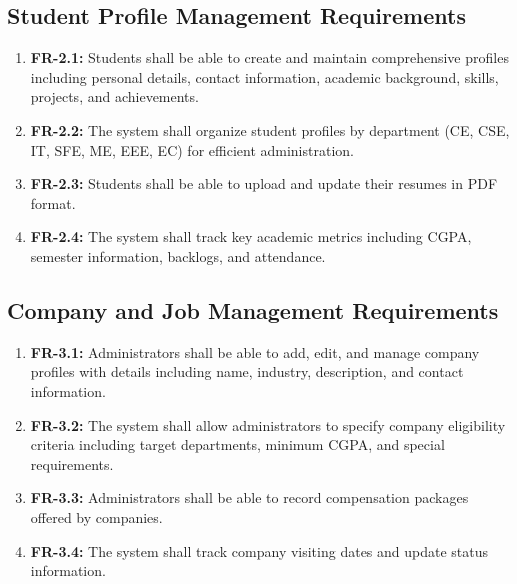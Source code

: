 \documentclass[12pt,a4paper]{report}
\begin{document}
\subsection{Student Profile Management Requirements}
\begin{enumerate}
    \item \textbf{FR-2.1:} Students shall be able to create and maintain comprehensive profiles including personal details, contact information, academic background, skills, projects, and achievements.
    
    \item \textbf{FR-2.2:} The system shall organize student profiles by department (CE, CSE, IT, SFE, ME, EEE, EC) for efficient administration.
    
    \item \textbf{FR-2.3:} Students shall be able to upload and update their resumes in PDF format.
    
    \item \textbf{FR-2.4:} The system shall track key academic metrics including CGPA, semester information, backlogs, and attendance.
\end{enumerate}

\subsection{Company and Job Management Requirements}
\begin{enumerate}
    \item \textbf{FR-3.1:} Administrators shall be able to add, edit, and manage company profiles with details including name, industry, description, and contact information.
    
    \item \textbf{FR-3.2:} The system shall allow administrators to specify company eligibility criteria including target departments, minimum CGPA, and special requirements.
    
    \item \textbf{FR-3.3:} Administrators shall be able to record compensation packages offered by companies.
    
    \item \textbf{FR-3.4:} The system shall track company visiting dates and update status information.
\end{enumerate}
\end{document}
